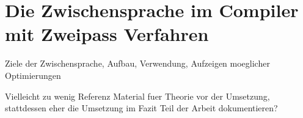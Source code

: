 \chapter{Die Zwischensprache im Compiler mit Zweipass Verfahren}
\label{chapter}

Ziele der Zwischensprache, Aufbau, Verwendung, Aufzeigen moeglicher Optimierungen

Vielleicht zu wenig Referenz Material fuer Theorie vor der Umsetzung, stattdessen eher die Umsetzung im Fazit Teil der Arbeit dokumentieren?
